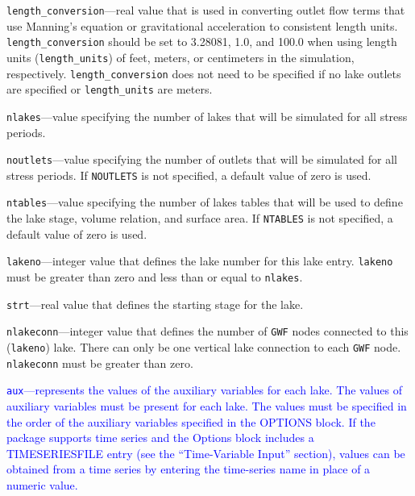 \item \texttt{length\_conversion}---real value that is used in converting outlet flow terms that use Manning's equation or gravitational acceleration to consistent length units. \texttt{length\_conversion} should be set to 3.28081, 1.0, and 100.0 when using length units (\texttt{length\_units}) of feet, meters, or centimeters in the simulation, respectively. \texttt{length\_conversion} does not need to be specified if no lake outlets are specified or \texttt{length\_units} are meters.

\item \texttt{nlakes}---value specifying the number of lakes that will be simulated for all stress periods.

\item \texttt{noutlets}---value specifying the number of outlets that will be simulated for all stress periods. If \texttt{NOUTLETS} is not specified, a default value of zero is used.

\item \texttt{ntables}---value specifying the number of lakes tables that will be used to define the lake stage, volume relation, and surface area. If \texttt{NTABLES} is not specified, a default value of zero is used.

\item \texttt{lakeno}---integer value that defines the lake number for this lake entry. \texttt{lakeno} must be greater than zero and less than or equal to \texttt{nlakes}.

\item \texttt{strt}---real value that defines the starting stage for the lake.

\item \texttt{nlakeconn}---integer value that defines the number of \texttt{GWF} nodes connected to this (\texttt{lakeno}) lake. There can only be one vertical lake connection to each \texttt{GWF} node. \texttt{nlakeconn} must be greater than zero.

\item \textcolor{blue}{\texttt{aux}---represents the values of the auxiliary variables for each lake. The values of auxiliary variables must be present for each lake. The values must be specified in the order of the auxiliary variables specified in the OPTIONS block.  If the package supports time series and the Options block includes a TIMESERIESFILE entry (see the ``Time-Variable Input'' section), values can be obtained from a time series by entering the time-series name in place of a numeric value.}

